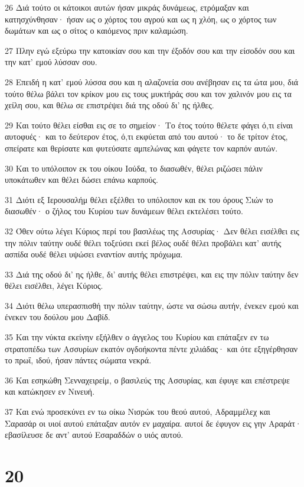 \par 26 Διά τούτο οι κάτοικοι αυτών ήσαν μικράς δυνάμεως, ετρόμαξαν και κατησχύνθησαν· ήσαν ως ο χόρτος του αγρού και ως η χλόη, ως ο χόρτος των δωμάτων και ως ο σίτος ο καιόμενος πριν καλαμώση.
\par 27 Πλην εγώ εξεύρω την κατοικίαν σου και την έξοδόν σου και την είσοδόν σου και την κατ' εμού λύσσαν σου.
\par 28 Επειδή η κατ' εμού λύσσα σου και η αλαζονεία σου ανέβησαν εις τα ώτα μου, διά τούτο θέλω βάλει τον κρίκον μου εις τους μυκτήράς σου και τον χαλινόν μου εις τα χείλη σου, και θέλω σε επιστρέψει διά της οδού δι' ης ήλθες.
\par 29 Και τούτο θέλει είσθαι εις σε το σημείον· Το έτος τούτο θέλετε φάγει ό,τι είναι αυτοφυές· και το δεύτερον έτος, ό,τι εκφύεται από του αυτού· το δε τρίτον έτος, σπείρατε και θερίσατε και φυτεύσατε αμπελώνας και φάγετε τον καρπόν αυτών.
\par 30 Και το υπόλοιπον εκ του οίκου Ιούδα, το διασωθέν, θέλει ριζώσει πάλιν υποκάτωθεν και θέλει δώσει επάνω καρπούς.
\par 31 Διότι εξ Ιερουσαλήμ θέλει εξέλθει το υπόλοιπον και εκ του όρους Σιών το διασωθέν· ο ζήλος του Κυρίου των δυνάμεων θέλει εκτελέσει τούτο.
\par 32 Όθεν ούτω λέγει Κύριος περί του βασιλέως της Ασσυρίας· Δεν θέλει εισέλθει εις την πόλιν ταύτην ουδέ θέλει τοξεύσει εκεί βέλος ουδέ θέλει προβάλει κατ' αυτής ασπίδα ουδέ θέλει υψώσει εναντίον αυτής πρόχωμα.
\par 33 Διά της οδού δι' ης ήλθε, δι' αυτής θέλει επιστρέψει, και εις την πόλιν ταύτην δεν θέλει εισέλθει, λέγει Κύριος.
\par 34 Διότι θέλω υπερασπισθή την πόλιν ταύτην, ώστε να σώσω αυτήν, ένεκεν εμού και ένεκεν του δούλου μου Δαβίδ.
\par 35 Και την νύκτα εκείνην εξήλθεν ο άγγελος του Κυρίου και επάταξεν εν τω στρατοπέδω των Ασσυρίων εκατόν ογδοήκοντα πέντε χιλιάδας· και ότε εξηγέρθησαν το πρωΐ, ιδού, ήσαν πάντες σώματα νεκρά.
\par 36 Και εσηκώθη Σενναχειρείμ, ο βασιλεύς της Ασσυρίας, και έφυγε και επέστρεψε και κατώκησεν εν Νινευή.
\par 37 Και ενώ προσεκύνει εν τω οίκω Νισρώκ του θεού αυτού, Αδραμμέλεχ και Σαρασάρ οι υιοί αυτού επάταξαν αυτόν εν μαχαίρα. αυτοί δε έφυγον εις γην Αραράτ· εβασίλευσε δε αντ' αυτού Εσαραδδών ο υιός αυτού.

\chapter{20}

